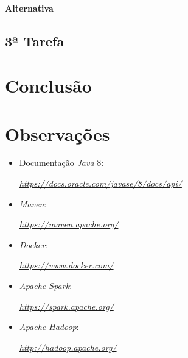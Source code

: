 \documentclass[a4paper]{report}
\begin{document}
            \subsubsection{Alternativa} \label{sssec:Task2-Ratings-Alternativa}

    \section{3ª Tarefa} \label{sec:Task3}


\chapter{Conclusão} \label{ch:Conclusion}
\large{
    
}

\appendix
\chapter{Observações} \label{ch:Observations}
\begin{itemize}
    \item Documentação \textit{Java} 8:
    \par \textit{\url{https://docs.oracle.com/javase/8/docs/api/}}
    \item \textit{Maven}:
    \par \textit{\url{https://maven.apache.org/}}
    \item \textit{Docker}:
    \par \textit{\url{https://www.docker.com/}}
    \item \textit{Apache Spark}:
    \par \textit{\url{https://spark.apache.org/}}
    \item \textit{Apache Hadoop}:
    \par \textit{\url{http://hadoop.apache.org/}}
\end{itemize}
\end{document}
